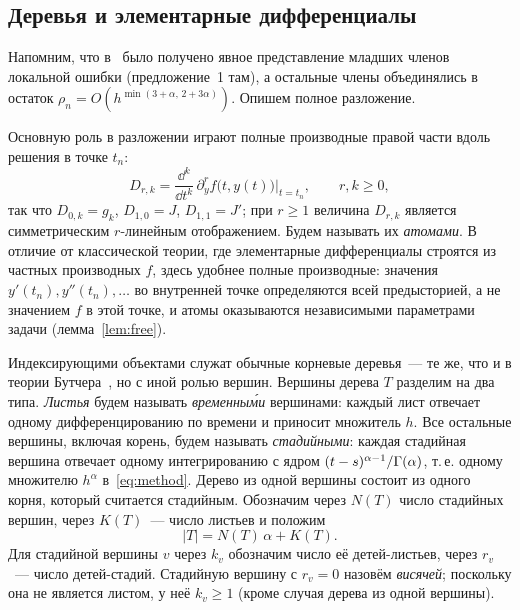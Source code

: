\subsection{Деревья и элементарные дифференциалы}\label{sec:trees}

Напомним, что в~\cite{PrikBarriers} было получено явное представление младших членов локальной ошибки (предложение~1 там), а остальные члены объединялись в остаток $\rho_n=O(h^{\min(3+\alpha,\,2+3\alpha)})$. Опишем полное разложение.

Основную роль в разложении играют полные производные правой части вдоль решения в точке $t_n$:
\begin{equation}\label{eq:atoms}
D_{r,k}=\frac{\dd^k}{\dd t^k}\,\partial_y^rf\bigl(t,y(t)\bigr)\Big|_{t=t_n},\qquad r,k\ge0,
\end{equation}
так что $D_{0,k}=g_k$, $D_{1,0}=J$, $D_{1,1}=J'$; при $r\ge1$ величина $D_{r,k}$ является симметрическим $r$-линейным отображением. Будем называть их \emph{атомами}. В отличие от классической теории, где элементарные дифференциалы строятся из частных производных $f$, здесь удобнее полные производные: значения $y'(t_n),y''(t_n),\dots$ во внутренней точке определяются всей предысторией, а не значением $f$ в этой точке, и атомы оказываются независимыми параметрами задачи (лемма~\ref{lem:free}).

Индексирующими объектами служат обычные корневые деревья~--- те же, что и в теории Бутчера~\cite{Butcher2016,HNW1993}, но с иной ролью вершин. Вершины дерева $T$ разделим на два типа. \emph{Листья} будем называть \emph{временны\'ми} вершинами: каждый лист отвечает одному дифференцированию по времени и приносит множитель $h$. Все остальные вершины, включая корень, будем называть \emph{стадийными}: каждая стадийная вершина отвечает одному интегрированию с ядром $(t-s)^{\alpha-1}/\Gamma(\alpha)$, т.\,е. одному множителю $h^{\alpha}$ в~\eqref{eq:method}. Дерево из одной вершины состоит из одного корня, который считается стадийным. Обозначим через $N(T)$ число стадийных вершин, через $K(T)$~--- число листьев и положим
\begin{equation}\label{eq:order}
|T|=N(T)\,\alpha+K(T).
\end{equation}
Для стадийной вершины $v$ через $k_v$ обозначим число её детей-листьев, через $r_v$~--- число детей-стадий. Стадийную вершину с $r_v=0$ назовём \emph{висячей}; поскольку она не является листом, у неё $k_v\ge1$ (кроме случая дерева из одной вершины).


